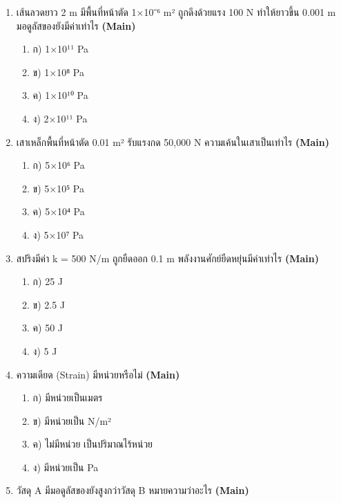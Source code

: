 \documentclass[12pt]{article}
\begin{document}
\begin{enumerate}[label=\arabic*.]
\begin{enumerate}[label=)]
\item ก) จุดที่วัตถุขาด
\item ข) จุดสูงสุดที่วัตถุสามารถยืดแล้วกลับคืนสภาพเดิมได้
\item ค) จุดที่วัตถุเริ่มเสียรูปถาวร
\item ง) จุดที่ความเค้นมากที่สุด
\end{enumerate}
\item เส้นลวดยาว 2 m มีพื้นที่หน้าตัด 1×10⁻⁶ m² ถูกดึงด้วยแรง 100 N ทำให้ยาวขึ้น 0.001 m มอดูลัสของยังมีค่าเท่าไร \hfill \textbf{\small (Main)}
\begin{enumerate}[label=)]
\item ก) 1×10¹¹ Pa
\item ข) 1×10⁸ Pa
\item ค) 1×10¹⁰ Pa
\item ง) 2×10¹¹ Pa
\end{enumerate}
\item เสาเหล็กพื้นที่หน้าตัด 0.01 m² รับแรงกด 50,000 N ความเค้นในเสาเป็นเท่าไร \hfill \textbf{\small (Main)}
\begin{enumerate}[label=)]
\item ก) 5×10⁶ Pa
\item ข) 5×10⁵ Pa
\item ค) 5×10⁴ Pa
\item ง) 5×10⁷ Pa
\end{enumerate}
\item สปริงมีค่า k = 500 N/m ถูกยืดออก 0.1 m พลังงานศักย์ยืดหยุ่นมีค่าเท่าไร \hfill \textbf{\small (Main)}
\begin{enumerate}[label=)]
\item ก) 25 J
\item ข) 2.5 J
\item ค) 50 J
\item ง) 5 J
\end{enumerate}
\item ความเดียด (Strain) มีหน่วยหรือไม่ \hfill \textbf{\small (Main)}
\begin{enumerate}[label=)]
\item ก) มีหน่วยเป็นเมตร
\item ข) มีหน่วยเป็น N/m²
\item ค) ไม่มีหน่วย เป็นปริมาณไร้หน่วย
\item ง) มีหน่วยเป็น Pa
\end{enumerate}
\item วัสดุ A มีมอดูลัสของยังสูงกว่าวัสดุ B หมายความว่าอะไร \hfill \textbf{\small (Main)}

\end{enumerate}
\end{document}

